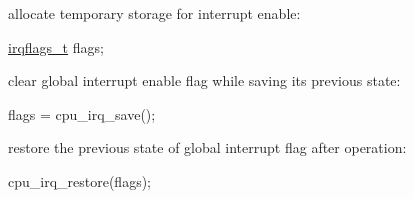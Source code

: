 \begin{DoxyEnumerate}
\item allocate temporary storage for interrupt enable\-:
\begin{DoxyItemize}
\item 
\begin{DoxyCode}
 \hyperlink{group__interrupt__group_ga9aa1f52defc97531b6343233abeea613}{irqflags\_t} flags; 
\end{DoxyCode}

\end{DoxyItemize}
\item clear global interrupt enable flag while saving its previous state\-:
\begin{DoxyItemize}
\item 
\begin{DoxyCode}
 flags = cpu\_irq\_save(); 
\end{DoxyCode}

\end{DoxyItemize}
\item restore the previous state of global interrupt flag after operation\-:
\begin{DoxyItemize}
\item 
\begin{DoxyCode}
 cpu\_irq\_restore(flags); 
\end{DoxyCode}
 
\end{DoxyItemize}
\end{DoxyEnumerate}